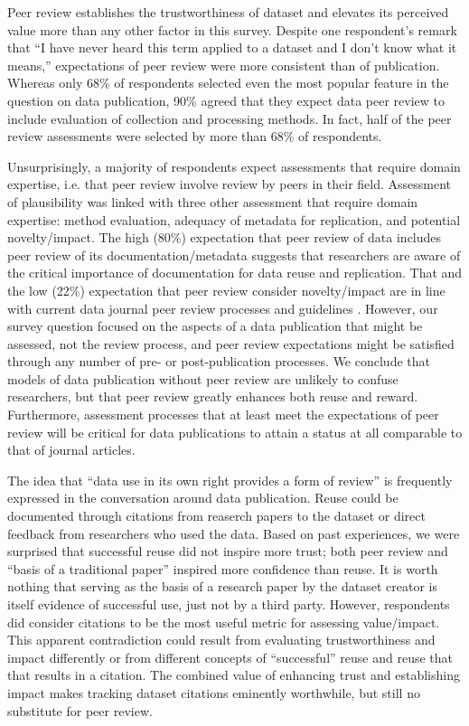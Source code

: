 \documentclass[10pt]{article}
\begin{document}
Peer review establishes the trustworthiness of dataset and elevates its perceived value more than any other factor in this survey.
Despite one respondent's remark that ``I have never heard this term applied to a dataset and I don't know what it means,'' expectations of peer review were more consistent than of publication. 
Whereas only 68\% of respondents selected even the most popular feature in the question on data publication, 90\% agreed that they expect data peer review to include evaluation of collection and processing methods.
In fact, half of the peer review assessments were selected by more than 68\% of respondents.

Unsurprisingly, a majority of respondents expect assessments that require domain expertise, i.e. that peer review involve review by peers in their field.
Assessment of plausibility was linked with three other assessment that require domain expertise: method evaluation, adequacy of metadata for replication, and potential novelty/impact.
The high (80\%) expectation that peer review of data includes peer review of its documentation/metadata suggests that researchers are aware of the critical importance of documentation for data reuse and replication.
That and the low (22\%) expectation that peer review consider novelty/impact are in line with current data journal peer review processes and guidelines \cite{kratz_data_2014}.
However, our survey question focused on the aspects of a data publication that might be assessed, not the review process, and peer review expectations might be satisfied through any number of pre- or post-publication processes.
We conclude that models of data publication without peer review are unlikely to confuse researchers, but that peer review greatly enhances both reuse and reward.
Furthermore, assessment processes that at least meet the expectations of peer review will be critical for data publications to attain a status at all comparable to that of journal articles.

The idea that ``data use in its own right provides a form of review'' \cite{parsons_data_2010} is frequently expressed in the conversation around data publication. 
Reuse could be documented through citations from reaserch papers to the dataset or direct feedback from researchers who used the data.
Based on past experiences, we were surprised that successful reuse did not inspire more trust; both peer review and ``basis of a traditional paper'' inspired more confidence than reuse.
It is worth nothing that serving as the basis of a research paper by the dataset creator is itself evidence of successful use, just not by a third party.
However, respondents did consider citations to be the most useful metric for assessing value/impact.
This apparent contradiction could result from evaluating trustworthiness and impact differently or from different concepts of  ``successful'' reuse and reuse that that results in a citation.
The combined value of enhancing trust and establishing impact makes tracking dataset citations eminently worthwhile, but still no substitute for peer review.
\end{document}
